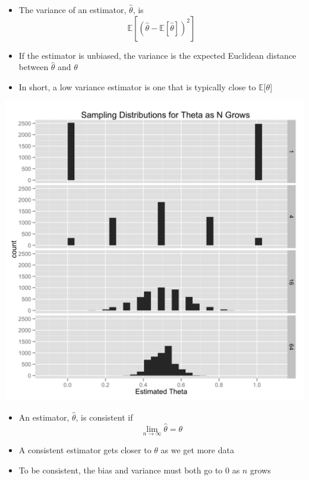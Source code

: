 \documentclass{beamer}
\begin{document}
\frame
{
  \begin{itemize}
    \item{The variance of an estimator, $\hat{\theta}$, is}
    \[
    \mathbb{E}[(\hat{\theta} - \mathbb{E}[\hat{\theta}]) ^ 2]
    \]
   \item{If the estimator is unbiased, the variance is the expected Euclidean distance between $\hat{\theta}$ and $\theta$}
   \item{In short, a low variance estimator is one that is typically close to $\mathbb{E}[\theta$]}
  \end{itemize}
}

\frame
{
  \begin{center}
    \includegraphics[scale = 0.1]{sampling_distribution.png}
  \end{center}
}

\frame
{
  \begin{itemize}
    \item{An estimator, $\hat{\theta}$, is consistent if}
    \[
    \lim_{n \to \infty} \hat{\theta} = \theta
    \]
    \item{A consistent estimator gets closer to $\theta$ as we get more data}
    \item{To be consistent, the bias and variance must both go to 0 as $n$ grows}
  \end{itemize}
}
\end{document}
